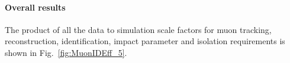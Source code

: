 
\paragraph*{Overall results}
The product of all the data to simulation scale factors for muon tracking, reconstruction, identification, impact parameter and isolation requirements is shown in Fig.~\ref{fig:MuonIDEff_5}. 

